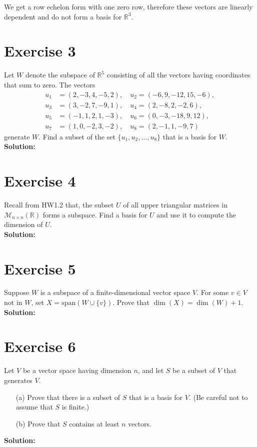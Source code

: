 \documentclass{article}
\begin{document}
We get a row echelon form with one zero row, therefore these vectors are linearly dependent and do not form a basis for $\mathbb{R}^3$.

\newpage

\section*{Exercise 3}
Let $W$ denote the subspace of $\mathbb{R}^5$ consisting of all the vectors having coordinates that sum to zero. The vectors
\begin{align*}
u_1 &= (2,-3,4,-5,2), \quad u_2 = (-6,9,-12,15,-6),\\
u_3 &= (3,-2,7,-9,1), \quad u_4 = (2,-8,2,-2,6),\\
u_5 &= (-1,1,2,1,-3), \quad u_6 = (0,-3,-18,9,12),\\
u_7 &= (1,0,-2,3,-2), \quad u_8 = (2,-1,1,-9,7)
\end{align*}
generate $W$. Find a subset of the set $\{u_1,u_2,\ldots,u_8\}$ that is a basis for $W$. \\

\textbf{Solution:} \\



\newpage

\section*{Exercise 4}
Recall from HW1.2 that, the subset $U$ of all upper triangular matrices in $\mathcal{M}_{n\times n}(\mathbb{R})$ forms a subspace. Find a basis for $U$ and use it to compute the dimension of $U$. \\

\textbf{Solution:} \\



\newpage

\section*{Exercise 5}
Suppose $W$ is a subspace of a finite-dimensional vector space $V$. For some $v \in V$ not in $W$, set $X = \text{span}(W \cup \{v\})$. Prove that $\dim(X) = \dim(W) + 1$. \\

\textbf{Solution:} \\

\newpage

\section*{Exercise 6}
Let $V$ be a vector space having dimension $n$, and let $S$ be a subset of $V$ that generates $V$.
\begin{itemize}
\item[(a)] Prove that there is a subset of $S$ that is a basis for $V$. (Be careful not to assume that $S$ is finite.)
\item[(b)] Prove that $S$ contains at least $n$ vectors.
\end{itemize}

\textbf{Solution:} \\
\end{document}
